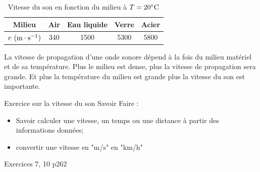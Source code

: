 \documentclass[french]{article}
\begin{document}
\begin{table}[ht!]
	\centering
	\begin{tabular}{|c|c|c|c|c|}
	\hline
	\textbf{Milieu}               & Air & Eau liquide & Verre & Acier \\ \hline
	$v~(\rm m \cdot s^{-1})$ & 340 & 1500        & 5300  & 5800  \\ \hline
	\end{tabular}
	\caption{Vitesse du son en fonction du milieu à $T=20^\circ \rm C$}
\end{table}
La vitesse de propagation d'une onde sonore dépend à la fois du milieu matériel et de sa température. Plus le milieu est dense, plus la vitesse de propagation sera grande. Et plus la température du milieu est grande plus la vitesse du son est importante.\medskip

\begin{Exercice}{Exercice sur la vitesse du son}
	Savoir Faire :
	\begin{itemize}
		\item Savoir calculer une vitesse, un temps ou une distance à partir des informations données;
		\item convertir une vitesse en "m/s" en "km/h"
	\end{itemize}
	Exercices 7, 10 p262
\end{Exercice}









 
\end{document}

